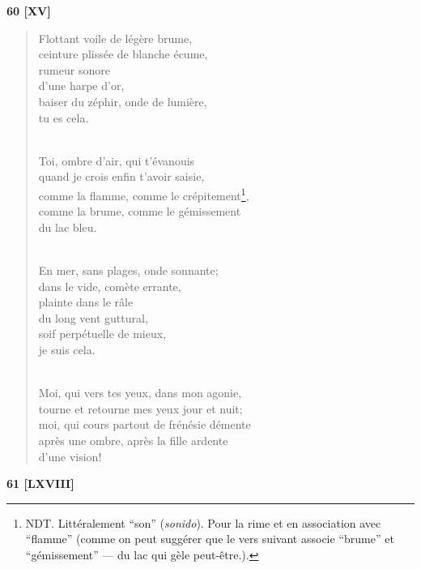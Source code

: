 \documentclass[a4paper,12pt]{book}
\begin{document}
\bigskip

\begin{center} {\bf 60 [XV]} \end{center}

\begin{verse}
Flottant voile de légère brume, \\
ceinture plissée de blanche écume, \\
rumeur sonore \\
d'une harpe d'or, \\
baiser du zéphir, onde de lumière, \\
tu es cela. \\ \

Toi, ombre d'air, qui t'évanouis \\
quand je crois enfin t'avoir saisie, \\
comme la flamme, comme le crépitement\footnote{NDT. Littéralement ``son'' ({\em sonido}). Pour la rime et en association avec ``flamme'' (comme on peut suggérer que le vers suivant associe ``brume'' et ``gémissement'' --- du lac qui gèle peut-être.).}, \\
comme la brume, comme le gémissement \\
du lac bleu. \\ \

En mer, sans plages, onde sonnante; \\
dans le vide, comète errante, \\
plainte dans le râle \\
du long vent guttural, \\
soif perpétuelle de mieux, \\
je suis cela. \\ \

Moi, qui vers tes yeux, dans mon agonie, \\
tourne et retourne mes yeux jour et nuit; \\
moi, qui cours partout de frénésie démente \\
après une ombre, après la fille ardente \\
d'une vision! \\
\end{verse}

\bigskip

\begin{center} {\bf 61 [LXVIII]} \end{center}
\end{document}

